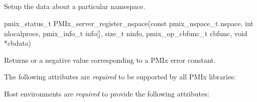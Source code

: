 \subsection{}

\summary

Setup the data about a particular namespace.

\format

\cspecificstart
\begin{codepar}
pmix_status_t
PMIx_server_register_nspace(const pmix_nspace_t nspace,
                        int nlocalprocs,
                        pmix_info_t info[], size_t ninfo,
                        pmix_op_cbfunc_t cbfunc, void *cbdata)
\end{codepar}
\cspecificend

\begin{arglist}
\end{arglist}

Returns  or a negative value corresponding to a PMIx error constant.

\reqattrstart
The following attributes are \textit{required} to be supported by all \ac{PMIx} libraries:


Host environments are \textit{required} to provide the following attributes:

